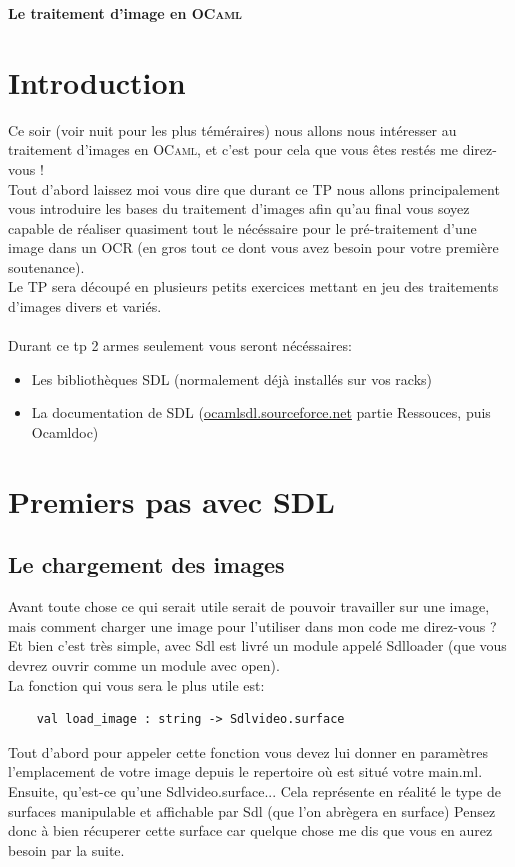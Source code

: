 \documentclass[a4paper]{article}
\begin{document}
\begin{center}
  {\Large {\bf Le traitement d'image en
  \textsc{OCaml}}}
\end{center}

\bigskip

\section*{Introduction}

Ce soir (voir nuit pour les plus téméraires) nous allons nous intéresser au traitement d'images en \textsc{OCaml}, et c'est pour cela que 
vous êtes restés me direz-vous !\\
Tout d'abord laissez moi vous dire que durant ce TP nous allons principalement vous introduire les
 bases du traitement d'images afin qu'au final vous soyez capable de réaliser quasiment tout le nécéssaire
 pour le pré-traitement d'une image dans un OCR (en gros tout ce dont vous avez besoin pour votre première soutenance).\\
Le TP sera découpé en plusieurs petits exercices mettant en jeu des traitements d'images divers et variés.\\\\
Durant ce tp 2 armes seulement vous seront nécéssaires:
\begin{itemize}
\item Les bibliothèques SDL (normalement déjà installés sur vos racks)
\item La documentation de SDL (\url{ocamlsdl.sourceforce.net} partie Ressouces, puis Ocamldoc)
\end{itemize}

\section{Premiers pas avec SDL}
\subsection{Le chargement des images}
Avant toute chose ce qui serait utile serait de pouvoir travailler sur une image, mais comment charger une image pour l'utiliser dans mon code me direz-vous ?\\
Et bien c'est très simple, avec Sdl est livré un module appelé Sdlloader (que vous devrez ouvrir comme un module avec open).\\
La fonction qui vous sera le plus utile est:

\vspace{3mm}
\begin{verbatim}
	val load_image : string -> Sdlvideo.surface
\end{verbatim}
\vspace{3mm}
Tout d'abord pour appeler cette fonction vous devez lui donner en paramètres l'emplacement de votre image depuis le repertoire où est situé votre main.ml.\\
Ensuite, qu'est-ce qu'une Sdlvideo.surface... Cela représente en réalité le type de surfaces manipulable et affichable par Sdl (que l'on abrègera en surface)
Pensez donc à bien récuperer cette surface car quelque chose me dis que vous en aurez besoin par la suite.
\end{document}
